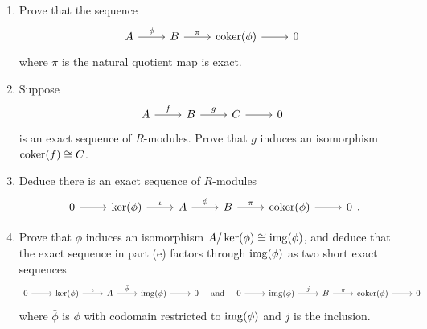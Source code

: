\documentclass[12pt,reqno]{amsart}
\begin{document}
\begin{enumerate}[leftmargin=*, series=problems]
\begin{enumerate}
\item Prove that the sequence
\[
\begin{tikzcd}
A \arrow[r, "\phi"] & B \arrow[r, "\pi"] & \coker(\phi) \arrow[r] & 0
\end{tikzcd}
\]
where $\pi$ is the natural quotient map is exact.
\item Suppose
\[
\begin{tikzcd}
A \arrow[r, "f"] & B \arrow[r, "g"] & C \arrow[r] & 0
\end{tikzcd}
\]
is an exact sequence of $R$-modules. Prove that $g$ induces an isomorphism $\operatorname{coker}(f)\cong C$.

\item Deduce there is an exact sequence of $R$-modules
\[
\begin{tikzcd}
0 \arrow[r] & \ker(\phi) \arrow[r, "\iota"] & A \arrow[r, "\phi"] & B \arrow[r, "\pi"] & \coker(\phi) \arrow[r] & 0 
\end{tikzcd}.
\]

\item Prove that $\phi$ induces an isomorphism $A/\ker(\phi)\cong\operatorname{img}(\phi)$, and deduce that the exact sequence in part (e) factors through $\operatorname{img}(\phi)$ as two short exact sequences
\[
\begin{tikzcd}
0 \arrow[r] & \ker(\phi) \arrow[r, "\iota"] & A \arrow[r, "\bar{\phi}"] & \img(\phi) \arrow[r] & 0
\end{tikzcd}
\quad\text{and}\quad
\begin{tikzcd}
0 \arrow[r] & \img(\phi) \arrow[r, "j"] & B \arrow[r, "\pi"] & \coker(\phi) \arrow[r] & 0
\end{tikzcd}
\]
where $\bar{\phi}$ is $\phi$ with codomain restricted to $\operatorname{img}(\phi)$ and $j$ is the inclusion.
\end{enumerate}


\end{enumerate}
\end{document}
